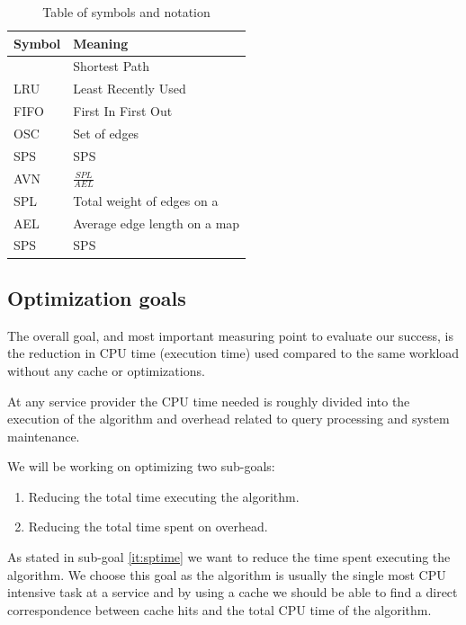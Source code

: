 \begin{table}
\begin{tabular*}{\columnwidth}{|l||p{}|}
\hline
Symbol		& Meaning \\\hline
\spath		& Shortest Path \\\hline
LRU		& Least Recently Used \\\hline
FIFO		& First In First Out \\\hline
OSC		& Set of edges \\\hline
\acs{SPS} 	& \acl{SPS} \\\hline
AVN 		& $\frac{SPL}{AEL}$ \\\hline
SPL	 	& Total weight of edges on a \spath \\\hline
AEL	 	& Average edge length on a map \\\hline
\acs{SPS} 	& \acl{SPS} \\\hline
\end{tabular*}
\caption{Table of symbols and notation} 
\label{tab:symbols}
\end{table}



\subsection{Optimization goals}\label{subsec:goals}

The overall goal, and most important measuring point to evaluate our success, is the reduction in CPU time (execution time) used compared to the same workload without any cache or optimizations.

At any \spath service provider the CPU time needed is roughly divided into the execution of the \spath algorithm and overhead related to query processing and system maintenance. 

We will be working on optimizing two sub-goals:
\begin{enumerate}
\item \label{it:sptime} Reducing the total time executing the \spath algorithm.
\item \label{it:ovtime} Reducing the total time spent on overhead.
\end{enumerate}


As stated in sub-goal \ref{it:sptime} we want to reduce the time spent executing the \spath algorithm. We choose this goal as the \spath algorithm is usually the single most CPU intensive task at a \spath service \cite{ref.} and by using a cache we should be able to find a direct correspondence between cache hits and the total CPU time of the \spath algorithm.

